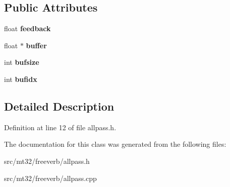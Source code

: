 \subsection*{Public Attributes}
\begin{DoxyCompactItemize}
\item 
\hypertarget{classallpass_a4aff3bfeba72ac4b1ce0ced6618ee77c}{float {\bfseries feedback}}\label{classallpass_a4aff3bfeba72ac4b1ce0ced6618ee77c}

\item 
\hypertarget{classallpass_aa6b769510364da1d9481948d4a154f8b}{float $\ast$ {\bfseries buffer}}\label{classallpass_aa6b769510364da1d9481948d4a154f8b}

\item 
\hypertarget{classallpass_a0156b24446b810952ae1df1accb8318f}{int {\bfseries bufsize}}\label{classallpass_a0156b24446b810952ae1df1accb8318f}

\item 
\hypertarget{classallpass_a662a39221d0880b3f99e3ec40e302d4c}{int {\bfseries bufidx}}\label{classallpass_a662a39221d0880b3f99e3ec40e302d4c}

\end{DoxyCompactItemize}


\subsection{Detailed Description}


Definition at line 12 of file allpass.\-h.



The documentation for this class was generated from the following files\-:\begin{DoxyCompactItemize}
\item 
src/mt32/freeverb/allpass.\-h\item 
src/mt32/freeverb/allpass.\-cpp\end{DoxyCompactItemize}
